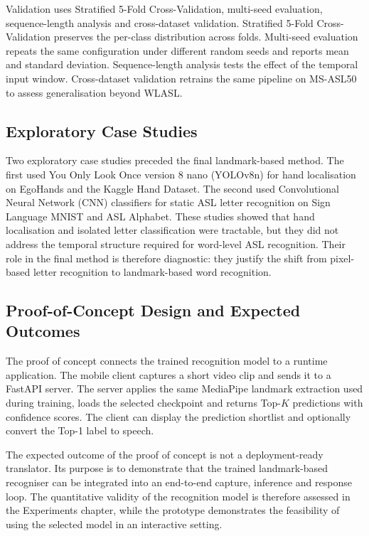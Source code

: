 Validation uses Stratified 5-Fold Cross-Validation, multi-seed evaluation, sequence-length analysis
and cross-dataset validation. Stratified 5-Fold Cross-Validation preserves the per-class
distribution across folds. Multi-seed evaluation repeats the same configuration under different
random seeds and reports mean and standard deviation. Sequence-length analysis tests the effect of
the temporal input window. Cross-dataset validation retrains the same pipeline on MS-ASL50 to
assess generalisation beyond WLASL.

\subsection{Exploratory Case Studies}

Two exploratory case studies preceded the final landmark-based method. The first used You Only Look
Once version 8 nano (YOLOv8n) for hand localisation on EgoHands and the Kaggle Hand Dataset. The
second used Convolutional Neural Network (CNN) classifiers for static ASL letter recognition on
Sign Language MNIST and ASL Alphabet. These studies showed that hand localisation and isolated
letter classification were tractable, but they did not address the temporal structure required for
word-level ASL recognition. Their role in the final method is therefore diagnostic: they justify
the shift from pixel-based letter recognition to landmark-based word recognition.

\subsection{Proof-of-Concept Design and Expected Outcomes}

The proof of concept connects the trained recognition model to a runtime application. The mobile
client captures a short video clip and sends it to a FastAPI server. The server applies the same
MediaPipe landmark extraction used during training, loads the selected checkpoint and returns
Top-$K$ predictions with confidence scores. The client can display the prediction shortlist and
optionally convert the Top-1 label to speech.

The expected outcome of the proof of concept is not a deployment-ready translator. Its purpose is
to demonstrate that the trained landmark-based recogniser can be integrated into an end-to-end
capture, inference and response loop. The quantitative validity of the recognition model is
therefore assessed in the Experiments chapter, while the prototype demonstrates the feasibility of
using the selected model in an interactive setting.

